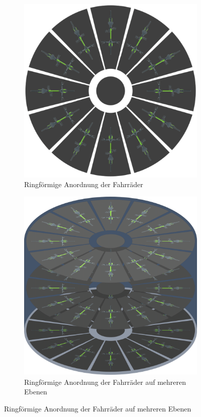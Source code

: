 \begin{figure}[ht]
  \centering
  \begin{subfigure}{0.39\textwidth}
    \centering
    \includegraphics[width=\textwidth]{images/rondell_skizze_oben.png}
    \caption{Ringförmige Anordnung der Fahrräder}
    \label{fig:rondell_skizze_oben}
  \end{subfigure}
  \begin{subfigure}{0.39\textwidth}
    \centering
    \includegraphics[width=\textwidth]{images/rondell_skizze_seite.png}
    \caption{Ringförmige Anordnung der Fahrräder auf mehreren Ebenen}
    \label{fig:rondell_skizze_seite}
  \end{subfigure}
\end{figure}

